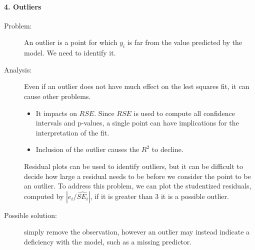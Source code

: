 \documentclass[a4paper]{article}
\begin{document}
						\paragraph{4. Outliers}
						\begin{description}
							\item[Problem:]	An outlier is a point for which $y_i$ is far from the value predicted by the model. We need to identify it.	
							
							\item[Analysis:] Even if an outlier does not have much effect on the lest squares fit, it can cause other problems.
							\begin{itemize}
								\item It impacts on $RSE$. Since $RSE$ is used to compute all confidence intervals and p-values, a single point can have implications for the interpretation of the fit.
								\item Inclusion of the outlier causes the $R^2$ to decline.
							\end{itemize}
							Residual plots can be used to identify outliers, but it can be difficult to decide how large a residual needs to be before we consider the point to be an outlier. To address this problem, we can plot the studentized residuals, computed by $|e_i/\hat{SE_i}|$, if it is greater than 3 it is a possible outlier.
							
							\item[Possible solution:] simply remove the observation, however an outlier may instead indicate a deficiency with the model, such as a missing predictor.
							
						
						\end{description}
							
							
\end{document}
